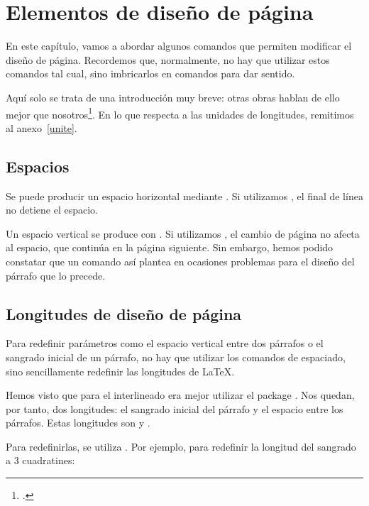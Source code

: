 \chapter{Elementos de diseño de página}\label{espacement}

\begin{intro}
En este capítulo, vamos a abordar algunos comandos que permiten modificar el diseño de página.
Recordemos que, normalmente, no hay que utilizar estos comandos tal cual, sino imbricarlos en comandos para dar sentido.

Aquí solo se trata de una introducción muy breve: otras obras hablan de ello mejor que nosotros\footcites(En particular)(){frama}{latex_graphic_companion}.
En lo que respecta a las unidades de longitudes, remitimos al anexo~\ref{unite}.
\end{intro}

\section{Espacios}\label{espace}

Se puede producir un espacio horizontal mediante . Si utilizamos , el final de línea no detiene el espacio.

Un espacio vertical se produce con . Si utilizamos , el cambio de página no afecta al espacio, que continúa en la página siguiente. Sin embargo, hemos podido constatar que un comando así plantea en ocasiones problemas para el diseño del párrafo que lo precede.



\section{Longitudes de diseño de página}

Para redefinir parámetros como el espacio vertical entre dos párrafos o el sangrado inicial de un párrafo, no hay que utilizar los comandos de espaciado, sino sencillamente redefinir las longitudes de \LaTeX.

Hemos visto que para el interlineado era mejor utilizar el package . Nos quedan, por tanto, dos longitudes: el sangrado inicial del párrafo y el espacio entre los párrafos. Estas longitudes son  y .

Para redefinirlas, se utiliza . Por ejemplo, para redefinir la longitud del sangrado a 3 cuadratines:\label{setlength}


